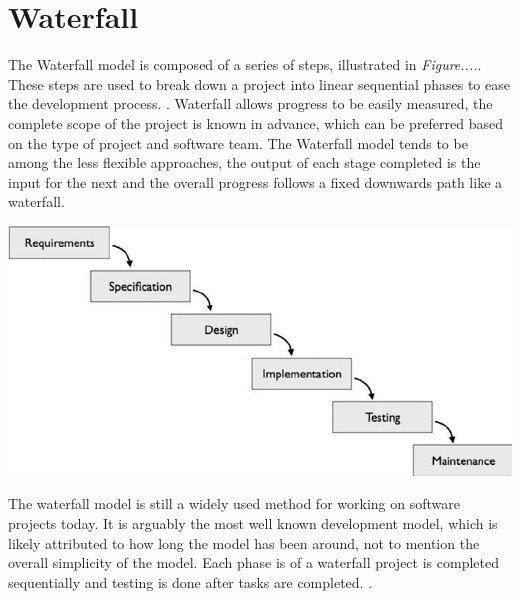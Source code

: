 \section{Waterfall}
The Waterfall model is composed of a series of steps, illustrated in \emph{Figure....}. These steps are used to break down a project into linear sequential phases to ease the development process.  \cite{petersen2009waterfall}. Waterfall allows progress to be easily measured, the complete scope of the project is known in advance, which can be preferred based on the type of project and software team. The Waterfall model tends to be among the less flexible approaches, the output of each stage completed is the input for the next and the overall progress follows a fixed downwards path like a waterfall.

\begin{center}
      \includegraphics[scale=0.46]{img/Waterfall.png}
\end{center}
\label{fig:x cubed graph}

The waterfall model is still a widely used method for working on software projects today. It is arguably the most well known development model, which is likely attributed to how long the model has been around, not to mention the overall simplicity of the model. Each phase is of a waterfall project is completed sequentially and testing is done after tasks are completed. \cite{balaji2012waterfall}.


